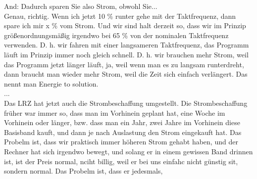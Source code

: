 And: Dadurch sparen Sie also Strom, obwohl Sie... \\
Genau, richtig. Wenn ich jetzt 10 \% runter gehe mit der Taktfrequenz, dann spare ich mir x \% vom Strom. Und wir sind halt derzeit so, dass wir im Prinzip größenordnungsmäßig irgendwo bei 65 \% von der nominalen Taktfrequenz verwenden. D. h. wir fahren mit einer langsameren Taktfrequenz, das Programm läuft im Prinzip immer noch gleich schnell. D. h. wir brauchen mehr Strom, weil das Programm jetzt länger läuft, ja, weil wenn man es zu langsam runterdreht, dann braucht man wieder mehr Strom, weil die Zeit sich einfach verlängert. Das nennt man Energie to solution. \\
[And: Das hat jetzt weniger mit uns zu tun, ]...\\
Das LRZ hat jetzt auch die Strombeschaffung umgestellt. Die Strombeschaffung früher war immer so, dass  man im Vorhinein geplant hat, eine Woche im Vorhinein oder länger, bzw. dass man ein Jahr, zwei Jahre im Vorhinein diese Basisband kauft, und dann je nach Auslastung den Strom eingekauft hat. Das Probelm ist, dass wir praktisch immer höheren Strom gehabt haben, und der Rechner hat sich irgendwo bewegt, und solang er in einem gewissen Band drinnen ist, ist der Preis normal, nciht billig, weil er bei uns einfahc nicht günstig sit, sondern normal. Das Probelm ist, dass er jedesmals, 